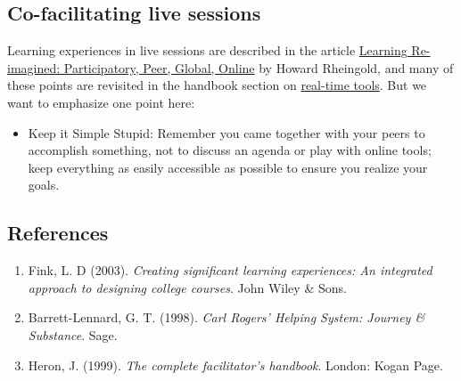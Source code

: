 \subsection{Co-facilitating live sessions}

Learning experiences in live sessions are described in the article
\href{http://dmlcentral.net/blog/howard-rheingold/learning-reimagined-participatory-peer-global-online}{Learning
Re-imagined: Participatory, Peer, Global, Online} by Howard Rheingold,
and many of these points are revisited in the handbook section on
\href{http://peeragogy.org/real-time-meetings/}{real-time tools}. But we
want to emphasize one point here:

\begin{itemize}
\item
  Keep it Simple Stupid: Remember you came together with your peers to
  accomplish something, not to discuss an agenda or play with online
  tools; keep everything as easily accessible as possible to ensure you
  realize your goals.
\end{itemize}
\subsection{References}

\begin{enumerate}
\item
  Fink, L. D (2003). \emph{Creating significant learning experiences: An
  integrated approach to designing college courses}. John Wiley \& Sons.
\item
  Barrett-Lennard, G. T. (1998). \emph{Carl Rogers' Helping System:
  Journey \& Substance}. Sage.
\item
  Heron, J. (1999). \emph{The complete facilitator's handbook}. London:
  Kogan Page.
\end{enumerate}

